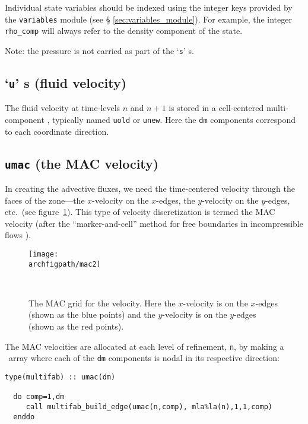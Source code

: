 Individual state variables should be indexed using the integer keys
provided by the {\tt variables} module (see \S
\ref{sec:variables_module}).  For example, the integer {\tt rho\_comp}
will always refer to the density component of the state.

Note: the pressure is not carried as part of the `{\tt s}' \multifab s.


\subsection{`{\tt u}' \multifab s (fluid velocity)}

The fluid velocity at time-levels $n$ and $n+1$ is stored in
a cell-centered multi-component \multifab, typically named
{\tt uold} or {\tt unew}.  Here the {\tt dm}
components correspond to each coordinate direction.

\subsection{{\tt umac} (the MAC velocity)}

In creating the advective fluxes, we need the time-centered velocity
through the faces of the zone---the $x$-velocity on the $x$-edges, the
$y$-velocity on the $y$-edges, etc.\ (see figure~\ref{fig:mac}).  This
type of velocity discretization is termed the MAC velocity (after the
``marker-and-cell'' method for free boundaries in incompressible
flows \cite{harlowwelch:1965}).



\begin{figure}[t]
\centering
\texttt{[image: \\archfigpath/mac2]}
\hspace{0.1in}
\begin{minipage}[b]{3.8in}
\caption[The MAC grid]
{\label{fig:mac} The MAC grid for the velocity.  
Here the $x$-velocity is on the $x$-edges (shown as the 
blue points) and the $y$-velocity is on the $y$-edges
(shown as the red points).
}\ \\
\end{minipage}
\end{figure}

The MAC velocities are allocated at each level of refinement, {\tt n},
by making a \multifab\ array where each of the {\tt dm} components is
nodal in its respective direction:
\begin{lstlisting}[language={[95]fortran},mathescape=false]
  type(multifab) :: umac(dm)

  do comp=1,dm
     call multifab_build_edge(umac(n,comp), mla%la(n),1,1,comp)
  enddo
\end{lstlisting}



